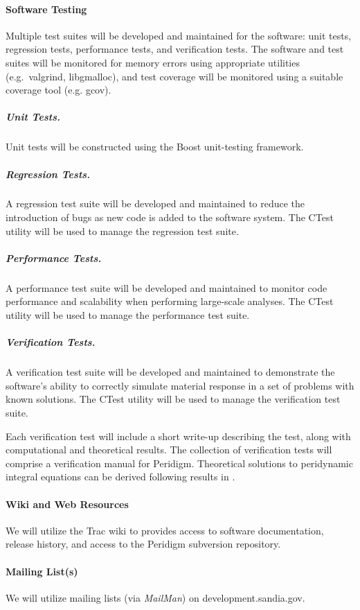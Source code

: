 \documentclass[10pt]{article}
\theoremstyle{plain}
\theoremstyle{definition}
\begin{document}
\paragraph{Software Testing}
Multiple test suites will be developed and maintained for the software:  unit tests, regression tests, performance tests, and verification tests.  The software and test suites will be monitored for memory errors using appropriate utilities (e.g.~valgrind, libgmalloc), and test coverage will be monitored using a suitable coverage tool (e.g. gcov).

\subparagraph{Unit Tests.}
Unit tests will be constructed using the Boost unit-testing framework.

\subparagraph{Regression Tests.}
A regression test suite will be developed and maintained to reduce the introduction of bugs as new code is added to the software system.  The CTest utility will be used to manage the regression test suite.

\subparagraph{Performance Tests.}
A performance test suite will be developed and maintained to monitor code performance and scalability when performing large-scale analyses.  The CTest utility will be used to manage the performance test suite.

\subparagraph{Verification Tests.}
A verification test suite will be developed and maintained to demonstrate the software's ability to correctly simulate material response in a set of problems with known solutions. The CTest utility will be used to manage the verification test suite.

Each verification test will include a short write-up describing the test, along with computational and theoretical results. The collection of verification tests will comprise a verification manual for Peridigm. Theoretical solutions to peridynamic integral equations can be derived following results in \cite{Weckner:2003:PDBar1,Weckner:2005:PDBar2,Weckner:2009:PDGreens}.

\paragraph{Wiki and Web Resources}
We will utilize the Trac wiki to provides access to software documentation, release history, and access to the Peridigm subversion repository.

\paragraph{Mailing List(s)}
We will utilize mailing lists (via \emph{MailMan}) on development.sandia.gov.
\end{document}
